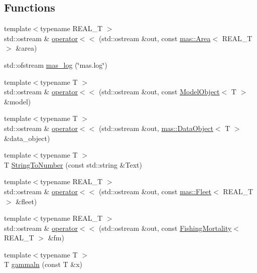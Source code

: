 \subsection*{Functions}
\begin{DoxyCompactItemize}
\item 
{\footnotesize template$<$typename R\-E\-A\-L\-\_\-\-T $>$ }\\std\-::ostream \& \hyperlink{namespacemas_aba0d00c366d7334ce6343f8011c2316c}{operator$<$$<$} (std\-::ostream \&out, const \hyperlink{structmas_1_1_area}{mas\-::\-Area}$<$ R\-E\-A\-L\-\_\-\-T $>$ \&area)
\item 
std\-::ofstream \hyperlink{namespacemas_a54c9771e0c0b38688aa18475d3644319}{mas\-\_\-log} (\char`\"{}mas.\-log\char`\"{})
\item 
{\footnotesize template$<$typename T $>$ }\\std\-::ostream \& \hyperlink{namespacemas_a798fc16eee04e2aeb2a546ab94f0791c}{operator$<$$<$} (std\-::ostream \&out, const \hyperlink{structmas_1_1_model_object}{Model\-Object}$<$ T $>$ \&model)
\item 
{\footnotesize template$<$typename T $>$ }\\std\-::ostream \& \hyperlink{namespacemas_a66ca3dc24d0031abac59251aae309c3e}{operator$<$$<$} (std\-::ostream \&out, \hyperlink{structmas_1_1_data_object}{mas\-::\-Data\-Object}$<$ T $>$ \&data\-\_\-object)
\item 
{\footnotesize template$<$typename T $>$ }\\T \hyperlink{namespacemas_aeee9d6c296b5c135169fb0fc3bbc399e}{String\-To\-Number} (const std\-::string \&Text)
\item 
{\footnotesize template$<$typename R\-E\-A\-L\-\_\-\-T $>$ }\\std\-::ostream \& \hyperlink{namespacemas_aa20a850225fc4b2869aaeb534692a778}{operator$<$$<$} (std\-::ostream \&out, const \hyperlink{structmas_1_1_fleet}{mas\-::\-Fleet}$<$ R\-E\-A\-L\-\_\-\-T $>$ \&fleet)
\item 
{\footnotesize template$<$typename R\-E\-A\-L\-\_\-\-T $>$ }\\std\-::ostream \& \hyperlink{namespacemas_a195c313c427ba1111d1805f94dcc5a4e}{operator$<$$<$} (std\-::ostream \&out, const \hyperlink{structmas_1_1_fishing_mortality}{Fishing\-Mortality}$<$ R\-E\-A\-L\-\_\-\-T $>$ \&fm)
\item 
{\footnotesize template$<$typename T $>$ }\\T \hyperlink{namespacemas_a9ad2e4ed241fffc7df106c2eef30a5b6}{gammaln} (const T \&x)

\end{DoxyCompactItemize}
